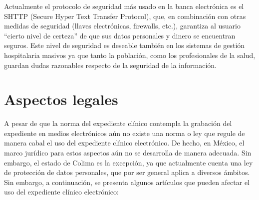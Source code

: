 Actualmente el protocolo de seguridad más usado en la banca electrónica es el SHTTP (Secure Hyper Text Transfer Protocol), que, en combinación con otras medidas de seguridad (llaves electrónicas, firewalls, etc.), garantiza al usuario “cierto nivel de certeza” de que sus datos personales y dinero se encuentran seguros. Este nivel de seguridad es deseable también en los sistemas de gestión hospitalaria masivos ya que tanto la población, como los profesionales de la salud, guardan dudas razonables respecto de la seguridad de la información. \cite{marco2}

\section{Aspectos legales}
A pesar de que la norma del expediente clínico contempla la grabación del expediente en medios electrónicos aún no existe una norma o ley que regule de manera cabal el uso del expediente clínico electrónico. De hecho, en México, el marco jurídico para estos aspectos aún no se desarrolla de manera adecuada. Sin embargo, el estado de Colima es la excepción, ya que actualmente cuenta una ley de protección de datos personales, que por ser general aplica a diversos ámbitos. Sin embargo, a continuación, se presenta algunos artículos que pueden afectar el uso del expediente clínico electrónico:

